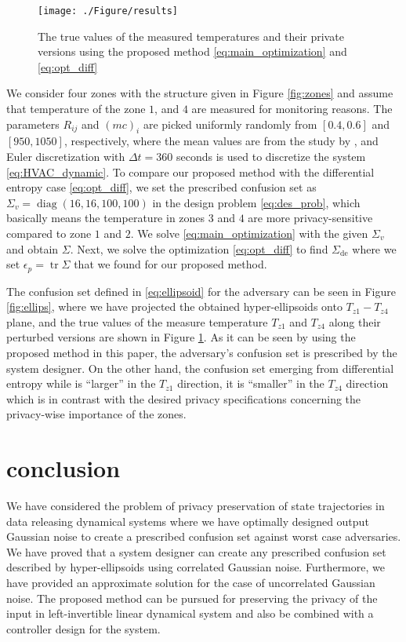 \documentclass{ifacconf}
\DeclareMathOperator{\diag}{diag}
\DeclareMathOperator{\tr}{tr}
\newcommand{\+}{\mathsmaller{+}}
\begin{document}
\begin{figure}[ht]
	\begin{center}
		\texttt{[image: ./Figure/results]}
		\caption{The true values of the measured temperatures and their private versions using the proposed method \eqref{eq:main_optimization} and \eqref{eq:opt_diff} }\label{fig:result_tem}
	\end{center}
\end{figure}
\par We consider four zones with the structure given in Figure \ref{fig:zones} and assume that temperature of the zone $1$, and $4$ are measured for monitoring reasons.
The parameters $R_{ij}$ and $(mc)_i$ are picked uniformly randomly from $[0.4,0.6]$ and $[950,1050]$, respectively, where the mean values are from the study by \cite{temp_parameter}, and Euler discretization with $\Delta t = 360$ seconds  is used to discretize the system \eqref{eq:HVAC_dynamic}.
 To compare our proposed method with the differential entropy case \eqref{eq:opt_diff},  we set the prescribed confusion set as $\Sigma_v = \diag(16, 16, 100, 100)$ in the design problem \eqref{eq:des_prob}, which basically means the  temperature in zones $3$ and $4$ are more privacy-sensitive compared to zone $1$ and $2$.
We solve \eqref{eq:main_optimization} with the given $\Sigma_v$ and obtain $\Sigma$. Next, we solve the optimization \eqref{eq:opt_diff} to find $\Sigma_{\text{de}}$ where we set $\epsilon_{p} = \tr \Sigma$ that we found for our proposed method.
\par The confusion set defined in \eqref{eq:ellipsoid} for the adversary  can be seen in Figure \ref{fig:ellips}, where we have projected the obtained hyper-ellipsoids onto $T_{z1}-T_{z4}$ plane, and the true values of the measure temperature $T_{z1}$ and $T_{z4}$ along their perturbed versions are shown in Figure \ref{fig:result_tem}.
As it can be seen by using the proposed method in this paper, the adversary's confusion set is prescribed by the system designer. On the other hand, the confusion set emerging from differential entropy while is ``larger'' in the $T_{z1}$ direction, it is ``smaller'' in the $T_{z4}$ direction which is in contrast with the desired privacy specifications concerning the privacy-wise importance of the zones. 
\section{conclusion}\label{sec:conclusion}
We have considered the problem of privacy preservation of state trajectories in data releasing dynamical systems where we have optimally designed output Gaussian noise to create a prescribed confusion set against worst case adversaries.
We have proved that a system designer can create any prescribed confusion set described by hyper-ellipsoids using correlated Gaussian noise.
 Furthermore, we have provided an approximate solution for the case of uncorrelated Gaussian noise.
   The proposed method can be pursued for preserving the privacy of the input in left-invertible linear dynamical system and also be combined with a controller design for the system. 
    
\end{document}

